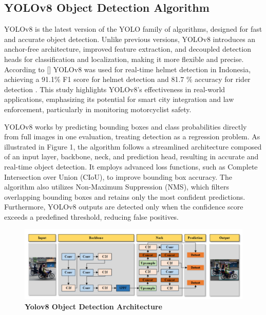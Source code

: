 \begin{refsection}
\section*{ YOLOv8 Object Detection Algorithm}


YOLOv8 is the latest version of the YOLO family of algorithms, designed for fast and accurate object detection. Unlike previous versions, YOLOv8 introduces an anchor-free architecture, improved feature extraction, and decoupled detection heads for classification and localization, making it more flexible and precise. According to \citeauthor{Muhammad2024} [\citeyear{Muhammad2024}] YOLOv8 was used for real-time helmet detection in Indonesia, achieving a 91.1\% F1 score for helmet detection and 81.7 \% accuracy for rider detection \cite{Muhammad2024}. This study highlights YOLOv8's effectiveness in real-world applications, emphasizing its potential for smart city integration and law enforcement, particularly in monitoring motorcyclist safety.

YOLOv8 works by predicting bounding boxes and class probabilities directly from full images in one evaluation, treating detection as a regression problem. As illustrated in Figure 1, the algorithm follows a streamlined architecture composed of an input layer, backbone, neck, and prediction head, resulting in accurate and real-time object detection. It employs advanced loss functions, such as Complete Intersection over Union (CIoU), to improve bounding box accuracy. The algorithm also utilizes Non-Maximum Suppression (NMS), which filters overlapping bounding boxes and retains only the most confident predictions. Furthermore, YOLOv8 outputs are detected only when the confidence score exceeds a predefined threshold, reducing false positives.

\begin{figure}[H]
    \centering
    \includegraphics[width=1\textwidth]{figures/Fig 1.png} %
    \caption{\textbf{Yolov8 Object Detection Architecture}}
    \label{fig:yolov8_architecture}
\end{figure}





\end{refsection}
